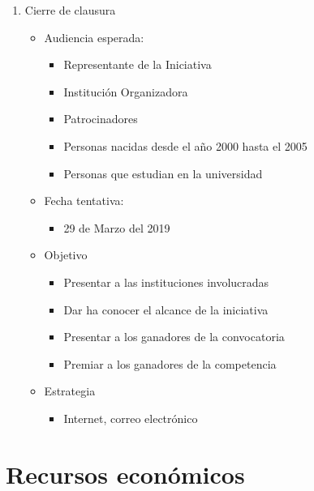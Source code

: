 \documentclass{article}
\begin{document}
\begin{enumerate}
\item Cierre de clausura
\begin{itemize}
\item Audiencia esperada:
\begin{itemize}
\item Representante de la Iniciativa
\item Institución Organizadora
\item Patrocinadores
\item Personas nacidas desde el año 2000 hasta el 2005
\item Personas que estudian en la universidad
\end{itemize}
\item Fecha tentativa:
\begin{itemize}
\item 29 de Marzo del 2019
\end{itemize}
\item Objetivo
\begin{itemize}
\item Presentar a las instituciones involucradas
\item Dar ha conocer el alcance de la iniciativa
\item Presentar a los ganadores de la convocatoria
\item Premiar a los ganadores de la competencia
\end{itemize}
\item Estrategia
\begin{itemize}
\item Internet, correo electrónico
\end{itemize}
\end{itemize}
\end{enumerate}


\section{Recursos económicos}
\end{document}
